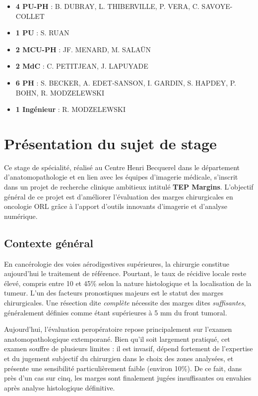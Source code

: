 \documentclass[11pt,a4paper]{report}
\begin{document}
\begin{itemize}
\item \textbf{4 PU-PH} : B. DUBRAY, L. THIBERVILLE, P. VERA, C. SAVOYE-COLLET
\item \textbf{1 PU} : S. RUAN
\item \textbf{2 MCU-PH} : JF. MENARD, M. SALAÜN
\item \textbf{2 MdC} : C. PETITJEAN, J. LAPUYADE
\item \textbf{6 PH} : S. BECKER, A. EDET-SANSON, I. GARDIN, S. HAPDEY, P. BOHN, R. MODZELEWSKI
\item \textbf{1 Ingénieur} : R. MODZELEWSKI
\end{itemize}

\chapter{Présentation du sujet de stage}

Ce stage de spécialité, réalisé au Centre Henri Becquerel dans le département d'anatomopathologie et en lien avec les équipes d'imagerie médicale, s'inscrit dans un projet de recherche clinique ambitieux intitulé \textbf{TEP Margins}. L'objectif général de ce projet est d'améliorer l'évaluation des marges chirurgicales en oncologie ORL grâce à l'apport d'outils innovants d'imagerie et d'analyse numérique.

\section{Contexte général}

En cancérologie des voies aérodigestives supérieures, la chirurgie constitue aujourd'hui le traitement de référence. Pourtant, le taux de récidive locale reste élevé, compris entre 10 et 45\% selon la nature histologique et la localisation de la tumeur. L'un des facteurs pronostiques majeurs est le statut des marges chirurgicales. Une résection dite \textit{complète} nécessite des marges dites \textit{suffisantes}, généralement définies comme étant supérieures à 5 mm du front tumoral.

Aujourd'hui, l'évaluation peropératoire repose principalement sur l'examen anatomopathologique extemporané. Bien qu'il soit largement pratiqué, cet examen souffre de plusieurs limites : il est invasif, dépend fortement de l'expertise et du jugement subjectif du chirurgien dans le choix des zones analysées, et présente une sensibilité particulièrement faible (environ 10\%). De ce fait, dans près d'un cas sur cinq, les marges sont finalement jugées insuffisantes ou envahies après analyse histologique définitive.
\end{document}
